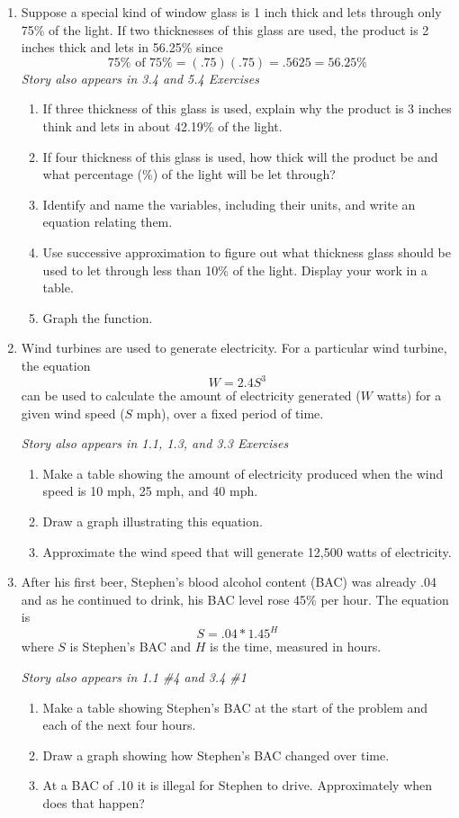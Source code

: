 \begin{enumerate}
\item Suppose a special kind of window glass is 1 inch thick and lets through only 75\% of the light. If two thicknesses of this glass are used, the product is 2 inches thick and lets in 56.25\% since $$75\% \text{ of } 75\% = (.75)(.75) = .5625 = 56.25\%$$ 
 \hfill \emph{Story also appears in 3.4 and 5.4 Exercises}
\begin{enumerate}
\item If three thickness of this glass is used, explain why the product is 3 inches think and lets in about 42.19\% of the light.
\item If four thickness of this glass is used, how thick will the product be and what percentage (\%) of the light will be let through?
\item Identify and name the variables, including their units, and write an equation relating them.
\item Use successive approximation to figure out what thickness glass should be used to let through less than 10\% of the light. Display your work in a table.
\item Graph the function.
\end{enumerate} 

\item Wind turbines are used to generate electricity.  For a particular wind turbine, the equation $$W = 2.4 S^3$$ can be used to calculate the amount of electricity generated ($W$ watts) for a given wind speed ($S$ mph), over a fixed period of time.

\hfill \emph{Story also appears in 1.1, 1.3, and 3.3 Exercises}
\begin{enumerate}
\item Make a table showing the amount of electricity produced when the wind speed is 10 mph, 25 mph, and 40 mph. 
\item Draw a graph illustrating this equation.
\item Approximate the wind speed that will generate 12,500 watts of electricity. 
\end{enumerate} 

\item After his first beer, Stephen's blood alcohol content (BAC) was already .04 and as he continued to drink, his BAC level rose 45\% per hour.  The equation is $$S = .04 \ast 1.45^H$$ where $S$ is Stephen's BAC and $H$ is the time, measured in hours.

\hfill \emph{Story also appears in 1.1 \#4 and 3.4 \#1} 
\begin{enumerate}
\item Make a table showing Stephen's BAC at the start of the problem and each of the next four hours.
\item Draw a graph showing how Stephen's BAC changed over time.
\item At a BAC of .10 it is illegal for Stephen to drive.  Approximately when does that happen?
\end{enumerate}  


\end{enumerate}
